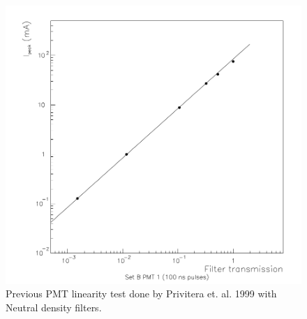 \begin{figure}
\centering
\includegraphics[width=\textwidth]{chapters/graphs/PMTchar/pmt_linearity_100V_privitera.png}
\caption{Previous PMT linearity test done by Privitera et. al. 1999 with Neutral density filters.}
\end{figure}

